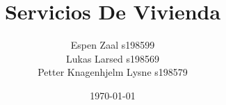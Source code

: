 \begin{titlepage}
 



\title{Servicios De Vivienda}


\author{Espen Zaal s198599\\Lukas Larsed s198569\\Petter Knagenhjelm Lysne s198579}
\date{\today}



\end{titlepage}
